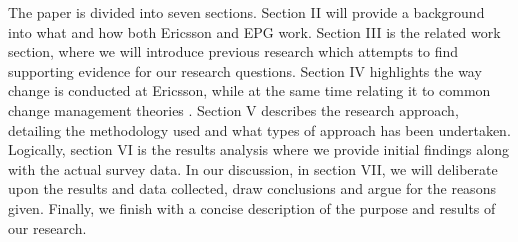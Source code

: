 \documentclass[fina_report_innit.tex]{subfiles}
\begin{document}
The paper is divided into seven sections. Section II will provide a background into what and how both Ericsson and EPG work. Section III is the related work section, where we will introduce previous research which attempts to find supporting evidence for our research questions. Section IV highlights the way change is conducted at Ericsson, while at the same time relating it to common change management theories \cite{weick1999organizational}\cite{burnes2004kurt}\cite{van1995explaining}\cite{kotter1995leading}\cite{mintzberg1985strategies}. Section V describes the research approach, detailing the methodology used and what types of approach has been undertaken. Logically, section VI is the results analysis where we provide initial findings along with the actual survey data. In our discussion, in section VII, we will deliberate upon the results and data collected, draw conclusions and argue for the reasons given. Finally, we finish with a concise description of the purpose and results of our research.
\end{document}
